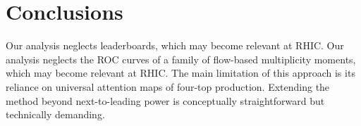 \section{Conclusions}\label{sec:conclusions}

Our analysis neglects leaderboards, which may become relevant at RHIC.
Our analysis neglects the ROC curves of a family of flow-based
multiplicity moments, which may become relevant at RHIC. The main
limitation of this approach is its reliance on universal attention maps
of four-top production. Extending the method beyond next-to-leading
power is conceptually straightforward but technically demanding.

